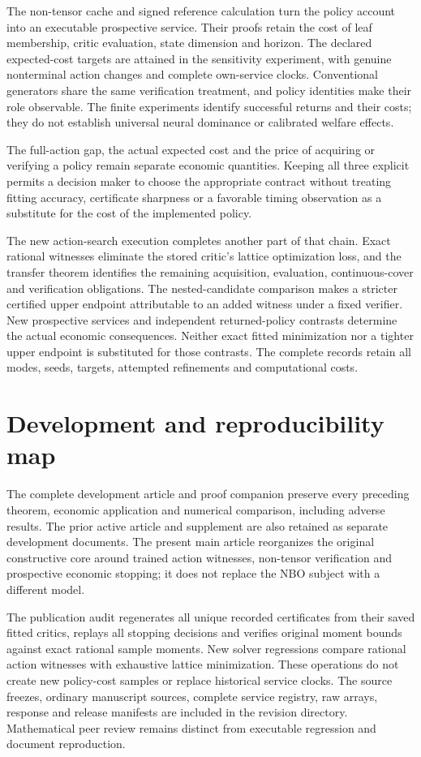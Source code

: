 \documentclass[ecta,nameyear,draft]{econsocart}
\begin{document}
The non-tensor cache and signed reference calculation turn the policy account into an executable prospective service. Their proofs retain the cost of leaf membership, critic evaluation, state dimension and horizon. The declared expected-cost targets are attained in the sensitivity experiment, with genuine nonterminal action changes and complete own-service clocks. Conventional generators share the same verification treatment, and policy identities make their role observable. The finite experiments identify successful returns and their costs; they do not establish universal neural dominance or calibrated welfare effects.

The full-action gap, the actual expected cost and the price of acquiring or verifying a policy remain separate economic quantities. Keeping all three explicit permits a decision maker to choose the appropriate contract without treating fitting accuracy, certificate sharpness or a favorable timing observation as a substitute for the cost of the implemented policy.

The new action-search execution completes another part of that chain. Exact rational witnesses eliminate the stored critic's lattice optimization loss, and the transfer theorem identifies the remaining acquisition, evaluation, continuous-cover and verification obligations. The nested-candidate comparison makes a stricter certified upper endpoint attributable to an added witness under a fixed verifier. New prospective services and independent returned-policy contrasts determine the actual economic consequences. Neither exact fitted minimization nor a tighter upper endpoint is substituted for those contrasts. The complete records retain all modes, seeds, targets, attempted refinements and computational costs.

\appendix
\section{Development and reproducibility map}\label{sec:map56}
The complete development article and proof companion preserve every preceding theorem, economic application and numerical comparison, including adverse results. The prior active article and supplement are also retained as separate development documents. The present main article reorganizes the original constructive core around trained action witnesses, non-tensor verification and prospective economic stopping; it does not replace the NBO subject with a different model.

The publication audit regenerates all unique recorded certificates from their saved fitted critics, replays all stopping decisions and verifies original moment bounds against exact rational sample moments. New solver regressions compare rational action witnesses with exhaustive lattice minimization. These operations do not create new policy-cost samples or replace historical service clocks. The source freezes, ordinary manuscript sources, complete service registry, raw arrays, response and release manifests are included in the revision directory. Mathematical peer review remains distinct from executable regression and document reproduction.



\end{document}
